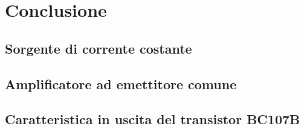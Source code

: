 \section*{Conclusione}

\subsection*{Sorgente di corrente costante}



\subsection*{Amplificatore ad emettitore comune}



\subsection*{Caratteristica in uscita del transistor BC107B}
